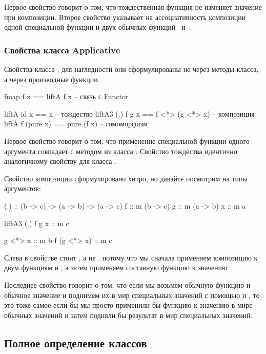 Первое свойство говорит о том, что тождественная функция
не изменяет значение при композиции. Второе свойство указывает на 
ассоциативность композиции одной специальной функции  
и двух обычных функций \mbox{ и }.


\subsubsection{Свойства класса Applicative}

Свойства класса , для наглядности они сформулированы
не через методы класса, а через производные функции.

\begin{code}
fmap f x            == liftA f x             -- связь с Functor

liftA  id x         == x                     -- тождество
liftA3 (.) f g x    == f <*> (g <*> x)       -- композиция 
liftA  f (pure x)   == pure (f x)            -- гомоморфизм
\end{code}

Первое свойство говорит о том, что применение специальной функции
одного аргумента совпадает с методом  из класса .
Свойство тождества идентично аналогичному свойству для класса
. 

Свойство композиции сформулировано хитро, но давайте 
посмотрим на типы аргументов:

\begin{code}
(.) :: (b -> c) -> (a -> b) -> (a -> c)
f   :: m (b -> c)
g   :: m (a -> b)    
x   :: m a

liftA3 (.) f g x :: m c

g <*> x      :: m b
f (g <*> x)  :: m c
\end{code}

Слева в свойстве стоит , а не ,
потому что мы сначала применяем композицию  к двум функциям
 и , а затем применяем составную функцию к значению .

Последнее свойство говорит о том, что если мы возьмём обычную функцию
и обычное значение и поднимем их в мир специальных значений с
помощью  и , то это тоже самое если бы
мы просто применили бы функцию  к значению в мире обычных
значений и затем подняли бы результат в мир специальных значений.


\subsection{Полное определение классов}


